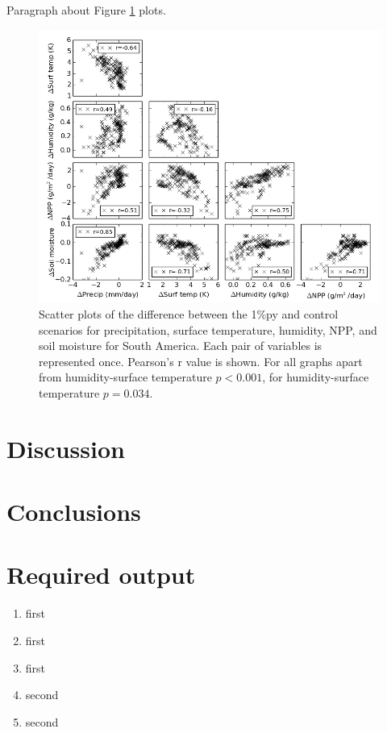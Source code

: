 \documentclass{article}
\begin{document}
Paragraph about Figure \ref{fig:corr} plots.
\begin{figure}[hbp]
    \centering
    \includegraphics[width=\textwidth]{figures/corr}
    \caption{Scatter plots of the difference between the 1\%py and control scenarios for precipitation, surface temperature, humidity, NPP, and soil moisture for South America. Each pair of variables is represented once. Pearson's r value is shown. For all graphs apart from humidity-surface temperature $p < 0.001$, for humidity-surface temperature $p = 0.034$. }
    \label{fig:corr}
\end{figure}

\newpage
\section{Discussion}

\section{Conclusions}

\printbibliography
\appendix 

\section{Required output}

\begin{enumerate}
    \item first
    \item first
    \item first
    \item second
    \item second
\end{enumerate}
\end{document}
